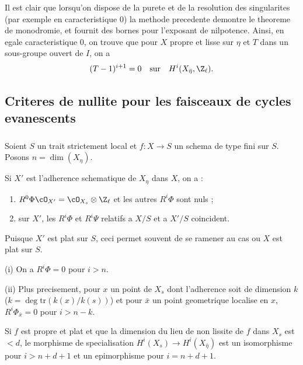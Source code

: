 \subsubsection{}
\label{subsubsec:3.8}
Il est clair que lorsqu'on dispose de la purete et de la resolution des singularites (par exemple en caracteristique $0$) la methode precedente demontre le theoreme de monodromie, et fournit des bornes pour l'exposant de nilpotence. Ainsi, en egale caracteristique $0$, on trouve que pour $X$ propre et lisse sur $\eta$ et $T$ dans un sous-groupe ouvert de $I$, on a
\[
(T - 1)^{i+1} = 0 \quad \text{sur} \quad H^i(X_{\bar{\eta}}, \Z_\ell) .
\]

\subsection{Criteres de nullite pour les faisceaux de cycles evanescents}
\label{subsec:criteres-nullite}

\subsubsection{}
\label{subsubsec:4.1}
Soient $S$ un trait strictement local et $f: X \to S$ un schema de type fini sur $S$. Posons $n = \dim(X_\eta)$.

Si $X'$ est l'adherence schematique de $X_\eta$ dans $X$, on a :
\begin{enumerate}[label=\alph*)]
\item $R^0 \Phi \cO_{X'} = \cO_{X_s} \otimes \Z_\ell$ et les autres $R^i \Phi$ sont nuls ;
\item sur $X'$, les $R^i \Phi$ et $R^i \Psi$ relatifs a $X/S$ et a $X'/S$ coincident.
\end{enumerate}

Puisque $X'$ est plat sur $S$, ceci permet souvent de se ramener au cas ou $X$ est plat sur $S$.

\begin{theorem}
\label{thm:4.2}
\textnormal{(i)} On a $R^i \Phi = 0$ pour $i > n$.

\textnormal{(ii)} Plus precisement, pour $x$ un point de $X_s$ dont l'adherence soit de dimension $k$ ($k = \deg\mathrm{tr}(k(x)/k(s))$) et pour $\bar{x}$ un point geometrique localise en $x$, $R^i \Phi_{\bar{x}} = 0$ pour $i > n - k$.
\end{theorem}

\begin{corollary}
\label{cor:4.3}
Si $f$ est propre et plat et que la dimension du lieu de non lissite de $f$ dans $X_s$ est $< d$, le morphisme de specialisation $H^i(X_s) \to H^i(X_{\bar{\eta}})$ est un isomorphisme pour $i > n + d + 1$ et un epimorphisme pour $i = n + d + 1$.
\end{corollary}

